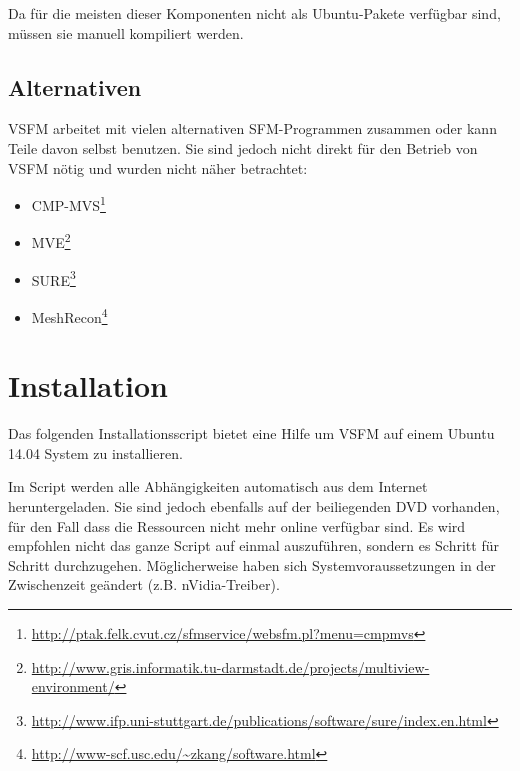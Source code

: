 \noindent Da für die meisten dieser Komponenten nicht als Ubuntu-Pakete
verfügbar sind, müssen sie manuell kompiliert werden.

\subsection{Alternativen}

VSFM arbeitet mit vielen alternativen SFM-Programmen zusammen oder kann Teile davon selbst
benutzen. Sie sind jedoch nicht direkt für den Betrieb von VSFM nötig und wurden
nicht näher betrachtet:

\begin{itemize}
	\item CMP-MVS\footnote{\url{http://ptak.felk.cvut.cz/sfmservice/websfm.pl?menu=cmpmvs}}
	\item MVE\footnote{\url{http://www.gris.informatik.tu-darmstadt.de/projects/multiview-environment/}}
	\item SURE\footnote{\url{http://www.ifp.uni-stuttgart.de/publications/software/sure/index.en.html}}
	\item MeshRecon\footnote{\url{http://www-scf.usc.edu/~zkang/software.html}}
\end{itemize}


\section{Installation}

Das folgenden Installationsscript bietet eine Hilfe um VSFM auf einem Ubuntu
14.04 System zu installieren.

Im Script werden alle Abhängigkeiten automatisch aus dem Internet
heruntergeladen. Sie sind jedoch ebenfalls auf der beiliegenden DVD vorhanden,
für den Fall dass die Ressourcen nicht mehr online verfügbar sind. Es wird
empfohlen nicht das ganze Script auf einmal auszuführen, sondern es Schritt für
Schritt durchzugehen. Möglicherweise haben sich Systemvoraussetzungen in der
Zwischenzeit geändert (z.B. nVidia-Treiber).

